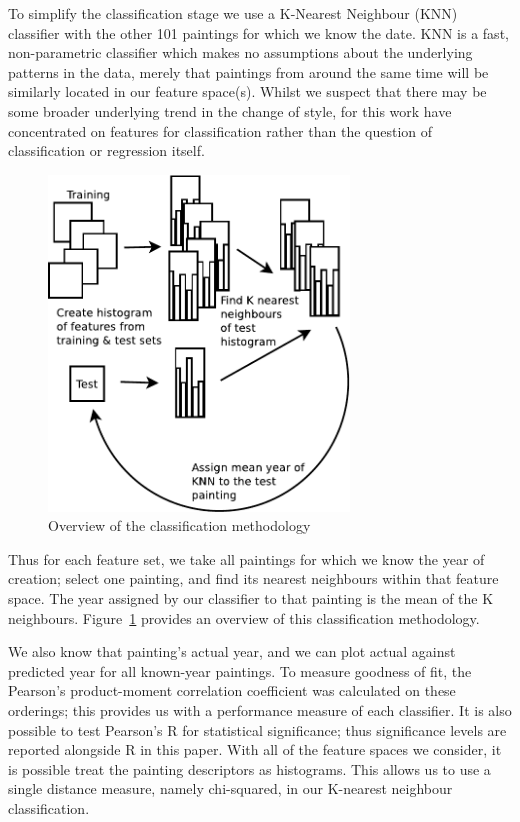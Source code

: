 \documentclass[conference,a4paper]{IEEEtran}
\begin{document}
To simplify the classification stage we use a K-Nearest Neighbour (KNN)
classifier with the other 101 paintings for which we know the date. KNN is a
fast, non-parametric classifier which makes no assumptions about the underlying
patterns in the data, merely that paintings from around the same time will be
similarly located in our feature space(s). Whilst we suspect that there may be
some broader underlying trend in the change of style, for this work have
concentrated on features for classification rather than the question of
classification or regression itself. 
 
\begin{figure}
\includegraphics[width=8cm]{img/kyffin_overview.pdf}
\caption{Overview of the classification methodology}
\label{LOOCV}
\end{figure}

Thus for each feature set, we take all paintings for which we know the year of
creation; select one painting, and find its nearest neighbours within that
feature space. The year assigned by our classifier to that painting is the 
mean of the K neighbours.
Figure~\ref{LOOCV} provides an overview of this classification methodology.


We also know that painting's actual year, and we can plot actual against
predicted year for all known-year paintings.  To measure goodness of fit, the
Pearson's product-moment correlation coefficient was calculated on these
orderings; this provides us with a performance measure of each classifier.  It
is also possible to test Pearson's R for statistical significance; thus
significance levels are reported alongside R in this paper.  With all of the
feature spaces we consider, it is possible treat the painting descriptors as
histograms.  This allows us to use a single distance measure, namely
chi-squared, in our K-nearest neighbour classification.
\end{document}
